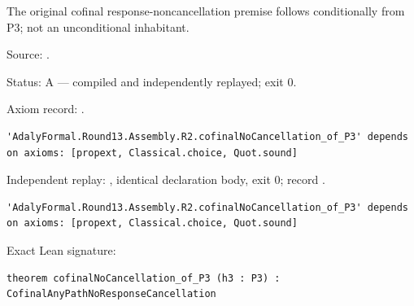 \begin{theorem}[bp-578]
\label{bp-578}
\leanok
The original cofinal response-noncancellation premise follows conditionally from P3; not an unconditional inhabitant.

\par Source: \texttt{}.
\par Status: A — compiled and independently replayed; exit 0.
\par Axiom record: \texttt{}.
\begin{verbatim}
'AdalyFormal.Round13.Assembly.R2.cofinalNoCancellation_of_P3' depends on axioms: [propext, Classical.choice, Quot.sound]
\end{verbatim}
\par Independent replay: \texttt{}, identical declaration body, exit 0; record \texttt{}.
\begin{verbatim}
'AdalyFormal.Round13.Assembly.R2.cofinalNoCancellation_of_P3' depends on axioms: [propext, Classical.choice, Quot.sound]
\end{verbatim}
\par Exact Lean signature:
\begin{verbatim}
theorem cofinalNoCancellation_of_P3 (h3 : P3) : CofinalAnyPathNoResponseCancellation
\end{verbatim}
\end{theorem}

